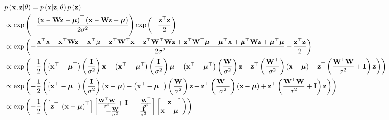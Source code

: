 \documentclass{article}
\begin{document}
	\begin{small}
	\begin{align}
		& p\left(\mathbf x, \mathbf z| \theta \right) = p\left(\mathbf x|\mathbf z, \theta \right)p\left(\mathbf z \right)\notag\\
		&\propto \mbox{exp}\left(-\frac{\left(\mathbf x-\mathbf W \mathbf z - \boldsymbol{\mu}\right)^{\top}\left(\mathbf x-\mathbf W \mathbf z - \boldsymbol{\mu}\right)}{2\sigma^2}\right)\mbox{exp}\left(-\frac{\mathbf z^\top \mathbf z}{2}\right)\notag\\
		&\propto \mbox{exp}\left(-\frac{\mathbf x^\top \mathbf x - \mathbf x^\top \mathbf W \mathbf z - \mathbf x^\top \boldsymbol \mu - \mathbf z^\top \mathbf W^\top \mathbf x + \mathbf z^\top \mathbf W^\top \mathbf W \mathbf z + \mathbf z^\top \mathbf W^\top \boldsymbol \mu - \boldsymbol \mu^\top \mathbf x + \boldsymbol \mu^\top \mathbf W \mathbf z + \boldsymbol \mu^\top \boldsymbol \mu}{2\sigma^2}-\frac{\mathbf z^\top \mathbf z}{2}\right)\notag\\
		& \propto \mbox{exp} \left( -\frac{1}{2}\left( \left(\mathbf x^\top - \boldsymbol \mu^\top\right)\left(\frac{\mathbf I}{\sigma^2}\right)\mathbf x - \left(\mathbf x^\top - \boldsymbol \mu^\top \right)\left(\frac{\mathbf I}{\sigma^2}\right)\boldsymbol \mu -\left(\mathbf x^\top - \boldsymbol \mu^\top \right)\left(\frac{\mathbf W}{\sigma^2}\right)\mathbf z -\mathbf z^\top \left(\frac{\mathbf W^\top}{\sigma^2}\right)\left(\mathbf x - \boldsymbol \mu\right)+\mathbf z^\top\left(\frac{\mathbf W^\top\mathbf W}{\sigma^2} + \mathbf I\right)\mathbf z\right) \right)	\notag	\\
		& \propto \mbox{exp} \left( -\frac{1}{2}\left( \left(\mathbf x^\top - \boldsymbol \mu^\top\right)\left(\frac{\mathbf I}{\sigma^2}\right)\left(\mathbf x - \boldsymbol \mu \right) -\left(\mathbf x^\top - \boldsymbol \mu^\top \right)\left(\frac{\mathbf W}{\sigma^2}\right)\mathbf z -\mathbf z^\top \left(\frac{\mathbf W^\top}{\sigma^2}\right)\left(\mathbf x - \boldsymbol \mu\right)+\mathbf z^\top\left(\frac{\mathbf W^\top\mathbf W}{\sigma^2} + \mathbf I\right)\mathbf z\right) \right)	\notag\\
		& \propto \mbox{exp} \left(-\frac{1}{2}\left(\left[\mathbf z^\top \;
		\left(\mathbf x - \boldsymbol \mu\right)^\top\right]\begin{bmatrix}
		\frac{\mathbf W^\top\mathbf W}{\sigma^2} + \mathbf I     & -\frac{\mathbf W^\top}{\sigma^2}      \\
		-\frac{\mathbf W}{\sigma^2}  & \frac{\mathbf I}{\sigma^2}
		\end{bmatrix}\begin{bmatrix}
		\mathbf z\\
		\mathbf x - \boldsymbol \mu
		\end{bmatrix}\right)\right)	\label{eq:joint_dist}
	\end{align}
	\end{small}
\end{document}
